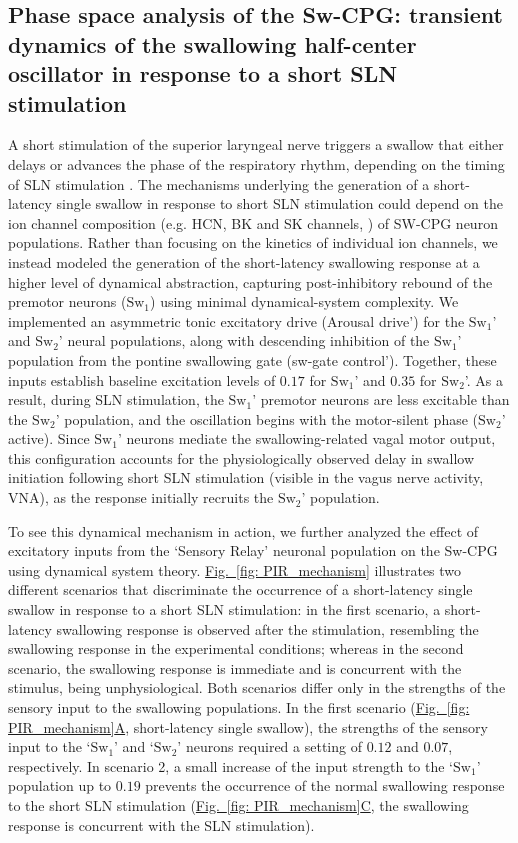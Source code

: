\documentclass[pdflatex,sn-mathphys-ay]{sn-jnl}%
\renewcommand{\figureautorefname}{Fig.}
\newcommand{\Figref}[2][]{\hyperref[#2]{\figureautorefname~\ref*{#2}#1}}
\theoremstyle{thmstyleone}%
\theoremstyle{thmstyletwo}%
\theoremstyle{thmstylethree}%
\begin{document}
\subsection{Phase space analysis of the Sw-CPG: transient dynamics of the swallowing half-center oscillator in response to a short SLN stimulation}
A short stimulation of the superior laryngeal nerve triggers a swallow that either delays or advances the phase of the respiratory rhythm, depending on the timing of SLN stimulation \citep{lewis1990effects, oku1992phase}. The mechanisms underlying the generation of a short-latency single swallow in response to short SLN stimulation could depend on the ion channel composition (e.g. HCN, BK and SK channels, \citep{molineux2008ionic}) of SW-CPG neuron populations. Rather than focusing on the kinetics of individual ion channels, we instead modeled the generation of the short-latency swallowing response at a higher level of dynamical abstraction, capturing post-inhibitory rebound of the premotor neurons ($\text{Sw}_1$) using minimal dynamical-system complexity. We implemented an asymmetric tonic excitatory drive (Arousal drive') for the $\text{Sw}_1$' and $\text{Sw}_2$' neural populations, along with descending inhibition of the $\text{Sw}_1$' population from the pontine swallowing gate (sw-gate control'). Together, these inputs establish baseline excitation levels of $0.17$ for $\text{Sw}_1$' and $0.35$ for $\text{Sw}_2$'. As a result, during SLN stimulation, the $\text{Sw}_1$' premotor neurons are less excitable than the $\text{Sw}_2$' population, and the oscillation begins with the motor-silent phase ($\text{Sw}_2$' active). Since $\text{Sw}_1$' neurons mediate the swallowing-related vagal motor output, this configuration accounts for the physiologically observed delay in swallow initiation following short SLN stimulation (visible in the vagus nerve activity, VNA), as the response initially recruits the $\text{Sw}_2$' population.

To see this dynamical mechanism in action, we further analyzed the effect of excitatory inputs from the `Sensory Relay' neuronal population on the Sw-CPG using dynamical system theory. \Figref[]{fig: PIR_mechanism} illustrates two different scenarios that discriminate the occurrence of a short-latency single swallow in response to a short SLN stimulation: in the first scenario, a short-latency swallowing response is observed after the stimulation, resembling the swallowing response in the experimental conditions; whereas in the second scenario, the swallowing response is immediate and is concurrent with the stimulus, being unphysiological. 
Both scenarios differ only in the strengths of the sensory input to the swallowing populations. In the first scenario (\Figref[A]{fig: PIR_mechanism}, short-latency single swallow), the strengths of the sensory input to the `$\text{Sw}_1$' and `$\text{Sw}_2$' neurons required a setting of $0.12$ and $0.07$, respectively. In scenario 2, a small increase of the input strength to the `$\text{Sw}_1$' population up to $0.19$ prevents the occurrence of the normal swallowing response to the short SLN stimulation (\Figref[C]{fig: PIR_mechanism}, the swallowing response is concurrent with the SLN stimulation). 
\end{document}
